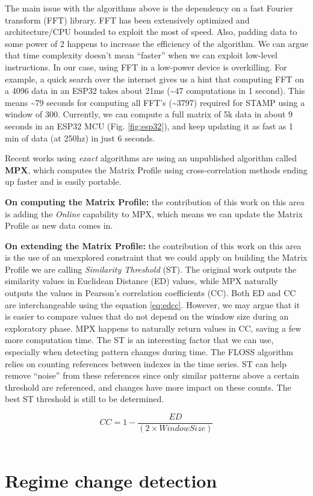 \documentclass[12pt,twoside]{fmupthesis}
\begin{document}
The main issue with the algorithms above is the dependency on a fast Fourier transform (FFT)
library. FFT has been extensively optimized and architecture/CPU bounded to exploit the most of
speed. Also, padding data to some power of 2 happens to increase the efficiency of the
algorithm. We can argue that time complexity doesn't mean ``faster'' when we can exploit low-level
instructions. In our case, using FFT in a low-power device is overkilling. For example, a quick
search over the internet gives us a hint that computing FFT on a 4096 data in an ESP32 takes
about 21ms (\textasciitilde47 computations in 1 second). This means \textasciitilde79 seconds for computing all FFT's
(\textasciitilde3797) required for STAMP using a window of 300. Currently, we can compute a full matrix of 5k
data in about 9 seconds in an ESP32 MCU (Fig. \ref{fig:esp32}), and keep updating it as fast as
1 min of data (at 250hz) in just 6 seconds.

Recent works using \emph{exact} algorithms are using an unpublished algorithm called \textbf{MPX}, which
computes the Matrix Profile using cross-correlation methods ending up faster and is easily
portable.

\textbf{On computing the Matrix Profile:} the contribution of this work on this area is adding the
\emph{Online} capability to MPX, which means we can update the Matrix Profile as new data comes in.

\textbf{On extending the Matrix Profile:} the contribution of this work on this area is the use of an
unexplored constraint that we could apply on building the Matrix Profile we are calling \emph{Similarity
Threshold} (ST). The original work outputs the similarity values in Euclidean Distance (ED) values,
while MPX naturally outputs the values in Pearson's correlation coefficients (CC). Both ED and CC
are interchangeable using the equation \eqref{eq:edcc}. However, we may argue that it is easier to
compare values that do not depend on the window size during an exploratory phase. MPX happens to
naturally return values in CC, saving a few more computation time. The ST is an interesting factor
that we can use, especially when detecting pattern changes during time. The FLOSS algorithm relies
on counting references between indexes in the time series. ST can help remove ``noise'' from these
references since only similar patterns above a certain threshold are referenced, and changes have
more impact on these counts. The best ST threshold is still to be determined.

\hfill\break
\begin{equation}
CC = 1 - \frac{ED}{(2 \times WindowSize)} \label{eq:edcc}
\end{equation}\\
\hypertarget{regime-change-detection-1}{%
\section{Regime change detection}\label{regime-change-detection-1}}
\end{document}
